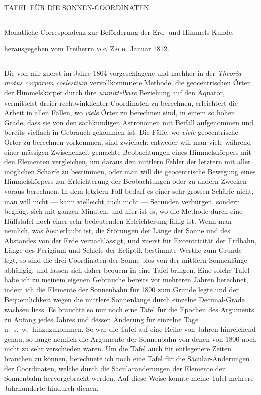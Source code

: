 \clearpage{}%
\begin{center}
{\small TAFEL FÜR DIE SONNEN-COORDINATEN.\par}
\medskip\hrule\medskip
{\small Monatliche Correspondenz zur Beförderung der Erd- und Himmels-Kunde,\par
herausgegeben vom Freiherrn \textsc{von Zach}. Januar 1812.\par}
\medskip\hrule
\end{center}\medskip
Die von mir zuerst im Jahre 1804 vorgeschlagene und nachher in der \emph{Theoria motus corporum coelestium} vervollkommnete Methode, die geocentrischen Örter der Himmelskörper durch ihre \emph{unmittelbare} Beziehung auf den Äquator, vermittelst dreier rechtwinklichter Coordinaten zu berechnen, erleichtert die Arbeit in allen Fällen, wo \emph{viele} Örter zu berechnen sind, in einem so hohen Grade, dass sie von den sachkundigen Astronomen mit Beifall aufgenommen und bereits vielfach in Gebrauch gekommen ist. Die Fälle, wo \emph{viele} geocentrische Örter zu berechnen vorkommen, sind zwiefach: entweder will man viele während einer mässigen Zwischenzeit gemachte Beobachtungen eines Himmelskörpers mit den Elementen vergleichen, um daraus den mittlern Fehler der letztern mit aller möglichen Schärfe zu bestimmen, oder man will die geocentrische Bewegung eines Himmelskörpers zur Erleichterung der Beobachtungen oder zu andern Zwecken voraus berechnen. In dem letztern Fall bedarf es einer sehr grossen Schärfe nicht, man will nicht --- kann vielleicht auch nicht --- Secunden verbürgen, sondern begnügt sich mit ganzen Minuten, und hier ist es, wo die Methode durch eine Hülfstafel noch einer sehr bedeutenden Erleichterung fähig ist. Wenn man nemlich, was \emph{hier} erlaubt ist, die Störungen der Länge der Sonne und des Abstandes von der Erde vernachlässigt, und zuerst für Excentricität der Erdbahn, Länge des Perigäum und Schiefe der Ecliptik bestimmte Werthe zum Grunde
%
legt, so sind die drei Coordinaten der Sonne blos von der mittlern Sonnenlänge abhängig, und lassen sich daher bequem in eine Tafel bringen. Eine solche Tafel habe ich zu meinem eigenen Gebrauche bereits vor mehreren Jahren berechnet, indem ich die Elemente der Sonnenbahn für 1800 zum Grunde legte und der Bequemlichkeit wegen die mittlere Sonnenlänge durch einzelne Decimal-Grade wachsen liess. Es brauchte so nur noch eine Tafel für die Epochen des Arguments zu Anfang jedes Jahres und dessen Änderung für einzelne Tage u.\ s.\ w.\ hinzuzukommen. So war die Tafel auf eine Reihe von Jahren hinreichend genau, so lange nemlich die Argumente der Sonnenbahn von denen von 1800 noch nicht zu sehr verschieden waren. Um die Tafel auch für entlegenere Zeiten brauchen zu können, berechnete ich noch eine Tafel für die Säcular-Änderungen der Coordinaten, welche durch die Säcularänderungen der Elemente der Sonnenbahn hervorgebracht werden. Auf diese Weise konnte meine Tafel mehrere Jahrhunderte hindurch dienen.

